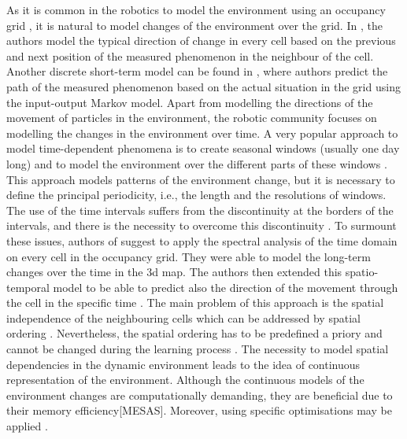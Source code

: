 As it is common in the robotics to model the environment using an occupancy grid \cite{elfes1989using}, it is natural to model changes of the environment over the grid.
In \cite{kucner2013conditional}, the authors model the typical direction of change in every cell based on the previous and next position of the measured phenomenon in the neighbour of the cell. 
Another discrete short-term model can be found in \cite{wang2014modeling}, where authors predict the path of the measured phenomenon based on the actual situation in the grid using the input-output Markov model.
Apart from modelling the directions of the movement of particles in the environment, the robotic community focuses on modelling the changes in the environment over time.
A very popular approach to model time-dependent phenomena is to create seasonal windows (usually one day long) and to model the environment over the different parts of these windows \cite{Van2008Using,Blanke2009Daily}.
This approach models patterns of the environment change, but it is necessary to define the principal periodicity, i.e., the length and the resolutions of windows.
The use of the time intervals suffers from the discontinuity at the borders of the intervals, and there is the necessity to overcome this discontinuity \cite{chinellato2017incremental}.
To surmount these issues, authors of \cite{krajnik2017fremen} suggest to apply the spectral analysis of the time domain on every cell in the occupancy grid. 
They were able to model the long-term changes over the time \cite{Krajnik2014Longterm} in the 3d map\cite{Krajnik2014Froctomap}.
The authors then extended this spatio-temporal model to be able to predict also the direction of the movement through the cell in the specific time \cite{molina2018modelling}.
The main problem of this approach is the spatial independence of the neighbouring cells which can be addressed by spatial ordering \cite{Cliff1975Model}.
Nevertheless, the spatial ordering has to be predefined a priory and cannot be changed during the learning process \cite{Shi2018Machine}.
The necessity to model spatial dependencies in the dynamic environment leads to the idea of continuous representation of the environment.
Although the continuous models of the environment changes are computationally demanding, they are beneficial due to their memory efficiency\cite{o2012gaussian}[MESAS].
Moreover, using specific optimisations may be applied \cite{ramos2016hilbert}.

